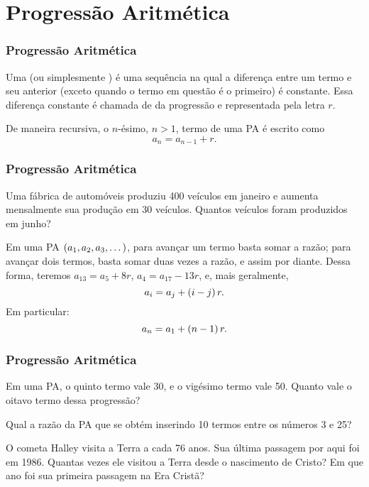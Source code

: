 \documentclass[brazil, notheorems, 10pt]{beamer}
\begin{document}

\section{Progressão Aritmética}
\begin{frame} \frametitle{Progressão Aritmética}
\begin{Def}
Uma  (ou simplesmente ) é uma
sequência na qual a diferença entre um termo e seu anterior (exceto
quando o termo em questão é o primeiro) é constante. Essa diferença
constante é chamada de  da progressão e representada pela
letra $r$.
\end{Def}


De maneira recursiva, o $n$-ésimo, $n>1$, termo de uma PA é escrito
como
$$a_n = a_{n-1} + r.$$


\end{frame}


\begin{frame}
\frametitle{Progressão Aritmética} %
\begin{Exem}
Uma fábrica de automóveis produziu 400 veículos em janeiro e aumenta
mensalmente sua produção em 30 veículos. Quantos veículos foram
produzidos em junho?
\end{Exem} \pause

Em uma PA $\left( a_1 , a_2 , a_3 , \dots \right)$, para avançar um termo
basta somar a razão; para avançar dois termos, basta somar duas
vezes a razão, e assim por diante. Dessa forma, teremos $a_{13} = a_5
+8r$, $a_4 = a_{17} - 13r$, e, mais geralmente, $$a_i = a_j +
\left(i-j\right)r.$$
Em particular:
$$a_n = a_1 + \left(n-1\right)r.$$

\end{frame}




\begin{frame}
\frametitle{Progressão Aritmética} %
\begin{Exem}
Em uma PA, o quinto termo vale 30, e o vigésimo termo vale 50. Quanto
vale o oitavo termo dessa progressão?
\end{Exem}\pause

\begin{Exem}
Qual a razão da PA que se obtém inserindo 10 termos entre os números
3 e 25?
\end{Exem}\pause

\begin{Exem}
O cometa Halley visita a Terra a cada 76 anos. Sua última passagem
por aqui foi em 1986. Quantas vezes ele visitou a Terra desde o
nascimento de Cristo? Em que ano foi sua primeira passagem na Era
Cristã?
\end{Exem}

\end{frame}
\end{document}
